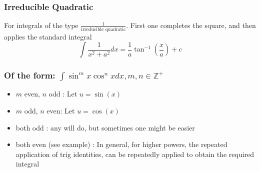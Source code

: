 \documentclass[english,course]{Notes}
\begin{document}
\subsubsection{Irreducible Quadratic}

\par{For integrals of the type $\frac{1}{\text{irreducible quadratic}}$. First one completes the square, and then applies the standard integral $$ \int \frac{1}{x^{2}+a^{2}} d x=\frac{1}{a} \tan ^{-1}\left(\frac{x}{a}\right)+c $$}


\subsubsection{Of the form: $\int \sin ^{m} x \cos ^{n} x d x, m, n \in \mathbb{Z}^{+}$}

\begin{itemize}
	\item[] $m$ even, $n$ odd : Let $u = \sin(x)$
	\item[] $m$ odd, $n$ even: Let $u = \cos(x)$
	\item[] both odd : any will do, but sometimes one might be easier
	\item[] both even (see example) : In general, for higher powers, the repeated application of trig identities, can be repeatedly applied to obtain the required integral
	\end{itemize}
	
\end{document}
